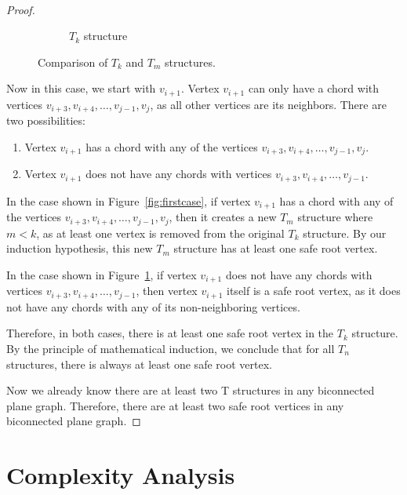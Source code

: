 ﻿﻿\documentclass[12pt,a4paper]{article}
\theoremstyle{definition}
\theoremstyle{remark}
\begin{document}
\begin{proof}
\begin{figure}[h]
\begin{subfigure}[b]{0.4\textwidth}
			\caption{$T_k$ structure}
			\label{fig:Tk_structure}
		\end{subfigure}


		\caption{Comparison of $T_k$ and $T_m$ structures.}
		\label{fig:merged_structures}
	\end{figure}

	Now in this case, we start with $v_{i+1}$. Vertex $v_{i+1}$ can only have a chord with vertices $v_{i+3}, v_{i+4}, \ldots, v_{j-1}, v_j$, as all other vertices are its neighbors. There are two possibilities:
	\begin{enumerate}
		\item Vertex $v_{i+1}$ has a chord with any of the vertices $v_{i+3}, v_{i+4}, \ldots, v_{j-1}, v_j$.
		\item Vertex $v_{i+1}$ does not have any chords with vertices $v_{i+3}, v_{i+4}, \ldots, v_{j-1}$.
	\end{enumerate}

	In the case shown in Figure~\ref{fig:firstcase}, if vertex $v_{i+1}$ has a chord with any of the vertices $v_{i+3}, v_{i+4}, \ldots, v_{j-1}, v_j$, then it creates a new $T_m$ structure where $m < k$, as at least one vertex is removed from the original $T_k$ structure. By our induction hypothesis, this new $T_m$ structure has at least one safe root vertex.

	In the case shown in Figure~\ref{fig:Tk_structure}, if vertex $v_{i+1}$ does not have any chords with vertices $v_{i+3}, v_{i+4}, \ldots, v_{j-1}$, then vertex $v_{i+1}$ itself is a safe root vertex, as it does not have any chords with any of its non-neighboring vertices.

	Therefore, in both cases, there is at least one safe root vertex in the $T_k$ structure. By the principle of mathematical induction, we conclude that for all $T_n$ structures, there is always at least one safe root vertex.

	Now we already know there are at least two T structures in any biconnected plane graph. Therefore, there are at least two safe root vertices in any biconnected plane graph.
\end{proof}

\section{Complexity Analysis}
\label{sec:complexity}
\end{document}
